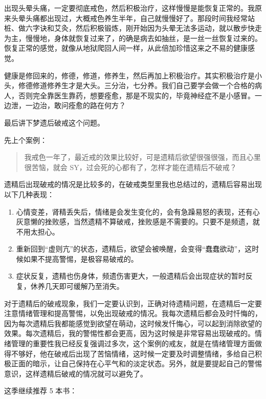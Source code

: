 \documentclass{ctexart}
\begin{document}
出现头晕头痛，一定要彻底戒色，然后积极治疗，这样慢慢是能恢复正常的。我原来头晕头痛都出现过，大概戒色养生半年，自己就慢慢好了。那段时间我经常站桩、做六字诀和艾灸，然后积极锻炼，刚开始因为头晕无法多运动，就以散步快走为主，慢慢地，身体就恢复过来了，的确是病去如抽丝，是一丝一丝恢复过来的。恢复正常的感觉，就像从地狱爬回人间一样，从此倍加珍惜这来之不易的健康感觉。

健康是修回来的，修德，修道，修养生，然后再加上积极治疗。其实积极治疗是小头，修德修道修养生才是大头。三分治，七分养。我们自己要学会做一个合格的病人，否则完全靠医生靠药，想要痊愈，那是不现实的，毕竟神经症不是小感冒。一边泄，一边治，敢问痊愈的路在何方？

最后讲下梦遗后破戒这个问题。

先上个案例：

\begin{quote}
    我戒色一年了，最近戒的效果比较好，可是遗精后欲望很强很强，而且心里很苦恼，就会 SY，过会死的心都有了，怎样才能在遗精后不破戒？
\end{quote}

遗精后出现破戒的情况是比较多的，在破戒类型里我也总结过的，遗精后容易出现以下几种表现：

\begin{enumerate}
    \item 心情变差，肾精丢失后，情绪是会发生变化的，会有急躁易怒的表现，还有心灰意懒的挫败感，当然遗精不算破戒，挫败感是不需要的。只要不是频遗，就不用太担心。
    \item 重新回到“虚则亢”的状态，遗精后，欲望会被唤醒，会变得“蠢蠢欲动”，这时候如果不提高警惕，是极容易破戒的。
    \item 症状反复，遗精也伤身体，频遗伤害更大，一般遗精后会出现症状的暂时反复，休养几天即可缓解乃至消失。
\end{enumerate}

对于遗精后的破戒现象，我们一定要认识到，正确对待遗精问题，在遗精后一定要注意情绪管理和提高警惕，以免出现破戒的情况。我每次遗精后都会及时忏悔的，因为每次遗精后我都能感觉到欲望在萌动，这时候发忏悔心，可以起到消除欲望的效果。每次遗精后，我的警惕性都会更高，因为这时候是非常容易出现破戒的。情绪管理的重要性我已经反复强调过多次，这个案例的戒友，就是在情绪管理方面做得不够好，他在破戒后出现了苦恼情绪，这时候一定要及时调整情绪，多给自己积极正面的暗示，让自己保持在心平气和的淡定状态。另外，就是要提起自己的警惕意识，这样遗精后破戒的情况就可以避免了。

这季继续推荐 5 本书：
\end{document}
